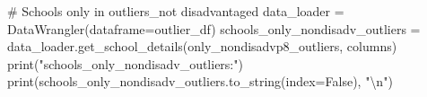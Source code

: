 \documentclass[
  letterpaper,
  DIV=11,
  numbers=noendperiod]{scrartcl}
\newenvironment{Shaded}{\begin{snugshade}}{\end{snugshade}}
\newcommand{\BuiltInTok}[1]{\textcolor[rgb]{0.00,0.23,0.31}{#1}}
\newcommand{\CharTok}[1]{\textcolor[rgb]{0.13,0.47,0.30}{#1}}
\newcommand{\CommentTok}[1]{\textcolor[rgb]{0.37,0.37,0.37}{#1}}
\newcommand{\NormalTok}[1]{\textcolor[rgb]{0.00,0.23,0.31}{#1}}
\newcommand{\OperatorTok}[1]{\textcolor[rgb]{0.37,0.37,0.37}{#1}}
\newcommand{\StringTok}[1]{\textcolor[rgb]{0.13,0.47,0.30}{#1}}
\newcommand{\VariableTok}[1]{\textcolor[rgb]{0.07,0.07,0.07}{#1}}
\begin{document}
\begin{Shaded}
\begin{Highlighting}[]
\CommentTok{\# Schools only in outliers\_not disadvantaged}
\NormalTok{data\_loader }\OperatorTok{=}\NormalTok{ DataWrangler(dataframe}\OperatorTok{=}\NormalTok{outlier\_df)}
\NormalTok{schools\_only\_nondisadv\_outliers }\OperatorTok{=}\NormalTok{ data\_loader.get\_school\_details(only\_nondisadvp8\_outliers, columns)}
\BuiltInTok{print}\NormalTok{(}\StringTok{"schools\_only\_nondisadv\_outliers:"}\NormalTok{)}
\BuiltInTok{print}\NormalTok{(schools\_only\_nondisadv\_outliers.to\_string(index}\OperatorTok{=}\VariableTok{False}\NormalTok{), }\StringTok{"}\CharTok{\textbackslash{}n}\StringTok{"}\NormalTok{)}
\end{Highlighting}
\end{Shaded}
\end{document}
